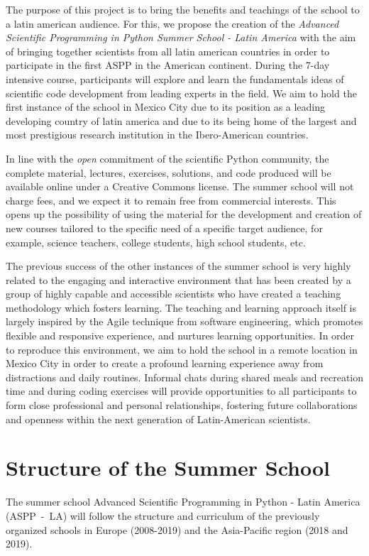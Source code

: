 \documentclass{article}[11pt]
\begin{document}
The purpose of this project is to bring the benefits and teachings of the
school to a latin american audience. For this, we propose the creation of the
\emph{Advanced Scientific Programming in Python Summer School - Latin America}
with the aim of bringing together scientists from all latin american countries
in order to participate in the first ASPP in the American continent. During the
7-day intensive course, participants will explore and learn the fundamentals
ideas of scientific code development from leading experts in the field. We aim
to hold the first instance of the school in Mexico City due to its position as
a leading developing country of latin america and due to its being home of the
largest and most prestigious research institution in the Ibero-American
countries.

In line with the \emph{open} commitment of the scientific Python community, the
complete material, lectures, exercises, solutions, and code produced will be
available online under a Creative Commons license. The summer school will not
charge fees, and we expect it to remain free from commercial interests. This
opens up the possibility of using the material for the development and creation
of new courses tailored to the specific need of a specific target audience, for
example, science teachers, college students, high school students, etc.

The previous success of the other instances of the summer school is very highly
related to the engaging and interactive environment that has been created by a
group of highly capable and accessible scientists who have created a teaching
methodology which fosters learning. The teaching and learning approach itself
is largely inspired by the Agile technique from software engineering, which
promotes flexible and responsive experience, and nurtures learning
opportunities. In order to reproduce this environment, we aim to hold the
school in a remote location in Mexico City in order to create a profound
learning experience away from distractions and daily routines. Informal chats
during shared meals and recreation time and during coding exercises will
provide opportunities to all participants to form close professional and
personal relationships, fostering future collaborations and openness within the
next generation of Latin-American scientists.


\section*{Structure of the Summer School}
The summer school Advanced Scientific Programming in Python - Latin America
(ASPP~-~LA) will follow the structure and curriculum of the previously
organized schools in Europe (2008-2019) and the Asia-Pacific region (2018 and
2019).
\end{document}

